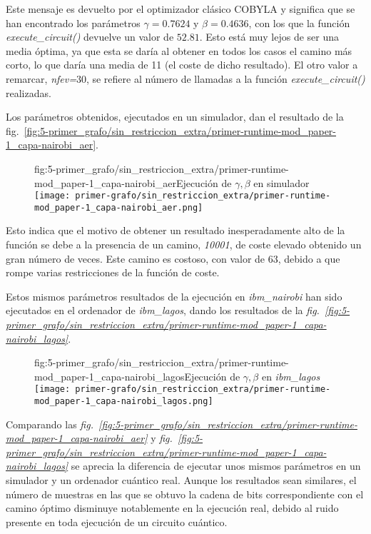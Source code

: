 Este mensaje es devuelto por el optimizador clásico COBYLA y significa que se han encontrado los parámetros $\gamma = 0.7624$ y $\beta = 0.4636$, con los que la función \textit{execute\_circuit()} devuelve un valor de $52.81$.
Esto está muy lejos de ser una media óptima, ya que esta se daría al obtener en todos los casos el camino más corto, lo que daría una media de 11 (el coste de dicho resultado).
El otro valor a remarcar, \textit{nfev=$30$}, se refiere al número de llamadas a la función \textit{execute\_circuit()} realizadas.

Los parámetros obtenidos, ejecutados en un simulador, dan el resultado de la fig.~\ref{fig:5-primer_grafo/sin_restriccion_extra/primer-runtime-mod_paper-1_capa-nairobi_aer}.

\begin{figure}[Resultados QAOA {--} artículo de Urgelles et al. (2022) {--} ejecución en simulador]{fig:5-primer_grafo/sin_restriccion_extra/primer-runtime-mod_paper-1_capa-nairobi_aer}{Ejecución de $\gamma, \beta$ en simulador}
  \centering
  \texttt{[image: primer-grafo/sin\_restriccion\_extra/primer-runtime-mod\_paper-1\_capa-nairobi\_aer.png]}
\end{figure}

Esto indica que el motivo de obtener un resultado inesperadamente alto de la función se debe a la presencia de un camino, \textit{10001}, de coste elevado obtenido un gran número de veces. Este camino es costoso, con valor de 63, debido a que rompe varias restricciones de la función de coste.

Estos mismos parámetros resultados de la ejecución en \textit{ibm\_nairobi} han sido ejecutados en el ordenador de \textit{ibm\_lagos}, dando los resultados de la \textit{fig.~\ref{fig:5-primer_grafo/sin_restriccion_extra/primer-runtime-mod_paper-1_capa-nairobi_lagos}}.

\begin{figure}[Resultados QAOA {--} artículo de Urgelles et al. (2022) {--} ejecución en ordenador real]{fig:5-primer_grafo/sin_restriccion_extra/primer-runtime-mod_paper-1_capa-nairobi_lagos}{Ejecución de $\gamma, \beta$ en \textit{ibm\_lagos}}
  \centering
  \texttt{[image: primer-grafo/sin\_restriccion\_extra/primer-runtime-mod\_paper-1\_capa-nairobi\_lagos.png]}
\end{figure}

Comparando las \textit{fig.~\ref{fig:5-primer_grafo/sin_restriccion_extra/primer-runtime-mod_paper-1_capa-nairobi_aer}} y \textit{fig.~\ref{fig:5-primer_grafo/sin_restriccion_extra/primer-runtime-mod_paper-1_capa-nairobi_lagos}}
se aprecia la diferencia de ejecutar unos mismos parámetros en un simulador y un ordenador cuántico real.
Aunque los resultados sean similares, el número de muestras en las que se obtuvo la cadena de bits correspondiente con el camino óptimo disminuye notablemente en la ejecución real, debido al ruido presente en toda ejecución de un circuito cuántico.



